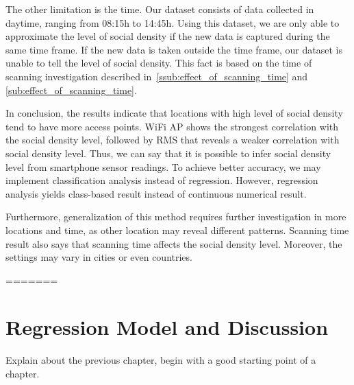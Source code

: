 
	The other limitation is the time. Our dataset consists of data collected in daytime, ranging from 08:15h to 14:45h. Using this dataset, we are only able to approximate the level of social density if the new data is captured during the same time frame. If the new data is taken outside the time frame, our dataset is unable to tell the level of social density. This fact is based on the time of scanning investigation described in~\autoref{ssub:effect_of_scanning_time} and \autoref{sub:effect_of_scanning_time}.
	

	

In conclusion, the results indicate that locations with high level of social density tend to have more access points. WiFi \ac{AP} shows the strongest correlation with the social density level, followed by \ac{RMS} that reveals a weaker correlation with social density level. Thus, we can say that it is possible to infer social density level from smartphone sensor readings. To achieve better accuracy, we may implement classification analysis instead of regression. However, regression analysis yields class-based result instead of continuous numerical result.

Furthermore, generalization of this method requires further investigation in more locations and time, as other location may reveal different patterns.
Scanning time result also says that scanning time affects the social density level. Moreover, the settings may vary in cities or even countries.


=======
\chapter{Regression Model and Discussion}
\label{ch:model-and-discussion} %
Explain about the previous chapter, begin with a good starting point of a chapter.

